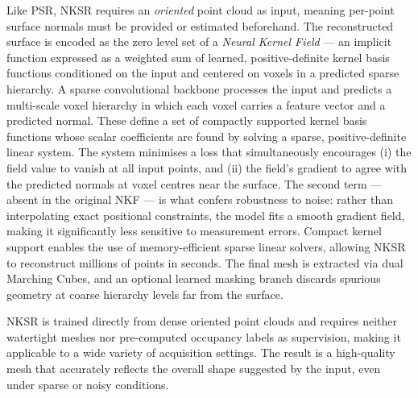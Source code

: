 Like PSR, NKSR requires an \emph{oriented} point cloud as input, meaning
per-point surface normals must be provided or estimated beforehand.
The reconstructed surface is encoded as the zero level set of a
\emph{Neural Kernel Field} --- an implicit function expressed as a
weighted sum of learned, positive-definite kernel basis functions
conditioned on the input and centered on voxels in a predicted sparse
hierarchy.
A sparse convolutional backbone processes the input and predicts a
multi-scale voxel hierarchy in which each voxel carries a feature vector
and a predicted normal.
These define a set of compactly supported kernel basis functions whose
scalar coefficients are found by solving a sparse, positive-definite
linear system.
The system minimises a loss that simultaneously encourages (i) the
field value to vanish at all input points, and (ii) the field's gradient
to agree with the predicted normals at voxel centres near the surface.
The second term --- absent in the original NKF --- is what confers
robustness to noise: rather than interpolating exact positional
constraints, the model fits a smooth gradient field, making it
significantly less sensitive to measurement errors.
Compact kernel support enables the use of memory-efficient sparse linear
solvers, allowing NKSR to reconstruct millions of points in seconds.
The final mesh is extracted via dual Marching Cubes, and an optional
learned masking branch discards spurious geometry at coarse hierarchy
levels far from the surface.

NKSR is trained directly from dense oriented point clouds and requires
neither watertight meshes nor pre-computed occupancy labels as
supervision, making it applicable to a wide variety of acquisition
settings.
The result is a high-quality mesh that accurately reflects the overall
shape suggested by the input, even under sparse or noisy conditions.
